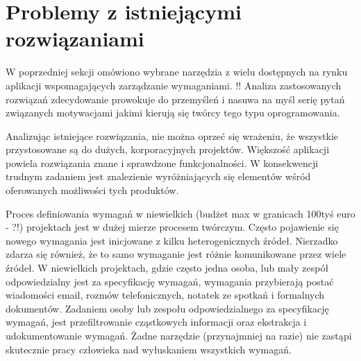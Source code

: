   \section{Problemy z istniejącymi rozwiązaniami}

      W poprzedniej sekcji omówiono wybrane narzędzia z wielu dostępnych na rynku aplikacji wspomagających zarządzanie wymaganiami. !! Analiza zastosowanych rozwiązań zdecydowanie prowokuje do przemyśleń i nasuwa na myśl serię pytań związanych motywacjami jakimi kierują się twórcy tego typu oprogramowania. 

      Analizując istniejące rozwiązania, nie można oprzeć się wrażeniu, że wszystkie przystosowane są do dużych, korporacyjnych projektów. Większość aplikacji powiela rozwiązania znane i sprawdzone funkcjonalności. W konsekwencji trudnym zadaniem jest znalezienie wyróżniających się elementów wśród oferowanych możliwości tych produktów. 

      Proces definiowania wymagań w niewielkich (budżet max w granicach 100tyś euro - ?!) projektach jest w dużej mierze procesem twórczym. Często pojawienie się nowego wymagania jest inicjowane z kilku heterogenicznych źródeł. Nierzadko zdarza się również, że to samo wymaganie jest różnie komunikowane przez wiele źródeł. W niewielkich projektach, gdzie często jedna osoba, lub mały zespół odpowiedzialny jest za specyfikację wymagań, wymagania przybierają postać wiadomości email, rozmów telefonicznych, notatek ze spotkań i formalnych dokumentów. Zadaniem osoby lub zespołu odpowiedzialnego za specyfikację wymagań, jest przefiltrowanie cząstkowych informacji oraz ekstrakcja i udokumentowanie wymagań. Żadne narzędzie (przynajmniej na razie) nie zastąpi skutecznie pracy człowieka nad wyłuskaniem wszystkich wymagań. 
